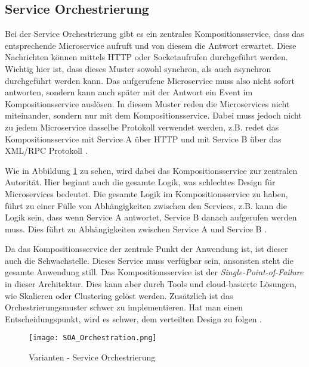 \subsection{Service Orchestrierung}
Bei der Service Orchestrierung gibt es ein zentrales Kompositionsservice, dass das entsprechende Microservice aufruft und von diesem die Antwort erwartet. Diese Nachrichten können mittels HTTP oder Socketaufrufen durchgeführt werden. Wichtig hier ist, dass dieses Muster sowohl synchron, als auch asynchron durchgeführt werden kann. Das aufgerufene Microservice muss also nicht sofort antworten, sondern kann auch später mit der Antwort ein Event im Kompositionsservice auslösen.
In diesem Muster reden die Microservices nicht miteinander, sondern nur mit dem Kompositionsservice. Dabei muss jedoch nicht zu jedem Microservice dasselbe Protokoll verwendet werden, z.B. redet das Kompositionsservice mit Service A über HTTP und mit Service B über das XML/RPC Protokoll \cite[Kapitel 3]{PracticalMicroservices}.

Wie in Abbildung \ref{fig:SOA_Orchestrierung} zu sehen, wird dabei das Kompositionsservice zur zentralen Autorität. Hier beginnt auch die gesamte Logik, was schlechtes Design für Microservices bedeutet. Die gesamte Logik im Kompositionsservice zu haben, führt zu einer Fülle von Abhängigkeiten zwischen den Services, z.B. kann die Logik sein, dass wenn Service A antwortet, Service B danach aufgerufen werden muss. Dies führt zu Abhängigkeiten zwischen Service A und Service B \cite[Kapitel 3]{PracticalMicroservices}.

Da das Kompositionsservice der zentrale Punkt der Anwendung ist, ist dieser auch die Schwachstelle. Dieses Service muss verfügbar sein, ansonsten steht die gesamte Anwendung still. Das Kompositionsservice ist der \textit{Single-Point-of-Failure} in dieser Architektur. Dies kann aber durch Tools und cloud-basierte Lösungen, wie Skalieren oder Clustering gelöst werden. Zusätzlich ist das Orchestrierungsmuster schwer zu implementieren. Hat man einen Entscheidungspunkt, wird es schwer, dem verteilten Design zu folgen \cite[Kapitel 3]{PracticalMicroservices}.

\begin{figure}[H]
	\begin{center}
		\texttt{[image: SOA\_Orchestration.png]}
		\caption[Varianten - Service Orchestrierung]{Varianten - Service Orchestrierung}
		\cite[Kapitel 3]{PracticalMicroservices}
		\label{fig:SOA_Orchestrierung}
	\end{center}
\end{figure}

